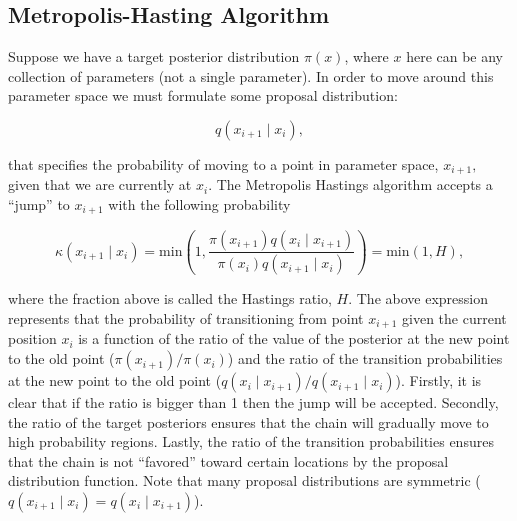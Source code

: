 \subsection{Metropolis-Hasting Algorithm}



Suppose we have a target posterior distribution $\pi(x)$, where $x$ here can be any collection of parameters (not a single parameter). In order to move around this parameter space we must formulate some proposal distribution:

$$q(x_{i+1}\mid x_i),$$

that specifies the probability of moving to a point in parameter space, $x_{i+1},$ given that we are currently at $x_i$. The Metropolis Hastings algorithm accepts a ``jump'' to $x_{i+1}$ with the following probability

$$\kappa(x_{i+1}\mid x_i) = \mathrm{min}\left(1, \frac{\pi(x_{i+1})q(x_i\mid x_{i+1})}{\pi(x_{i})q(x_{i+1}\mid x_{i})}\right) = \mathrm{min}(1, H),$$

where the fraction above is called the Hastings ratio, $H$. The above expression represents that the probability of transitioning from point $x_{i+1}$ given the current position $x_{i}$ is a function of the ratio of the value of the posterior at the new point to the old point (\ie $\pi(x_{i+1})/\pi(x_i)$) and the ratio of the transition probabilities at the new point to the old point (\ie $q(x_i\mid x_{i+1})/q(x_{i+1}\mid x_i)$). Firstly, it is clear that if the ratio is bigger than 1 then the jump will be accepted. Secondly, the ratio of the target posteriors ensures that the chain will gradually move to high probability regions. Lastly, the ratio of the transition probabilities ensures that the chain is not ``favored'' toward certain locations by the proposal distribution function. Note that many proposal distributions are symmetric (\ie $q(x_{i+1}\mid x_i) = q(x_i\mid x_{i+1})$).

